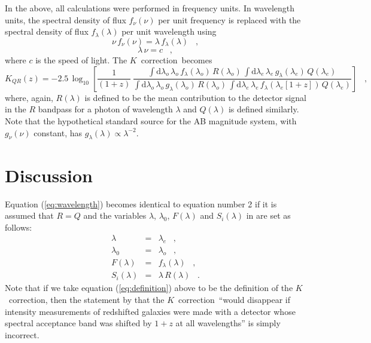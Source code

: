 \documentclass[preprint]{aastex}
\newcommand{\kcorrection}{$K$~correction}
\newcommand{\lambdaobs}{\lambda_o}
\newcommand{\lambdaemit}{\lambda_e}
\begin{document}
In the above, all calculations were performed in frequency units.  In
wavelength units, the spectral density of flux $f_{\nu}(\nu)$ per unit
frequency is replaced with the spectral density of flux
$f_{\lambda}(\lambda)$ per unit wavelength using
\begin{equation}
\nu\,f_{\nu}(\nu) = \lambda\,f_{\lambda}(\lambda) \;\;\;,
\end{equation}
\begin{equation}
\lambda\,\nu = c \;\;\;,
\end{equation}
where $c$ is the speed of light.  The \kcorrection\ becomes
\begin{equation}
\label{eq:wavelength}
K_{QR}(z) = -2.5\,\log_{10}\left[\frac{1}{(1+z)}\,
  \frac{\displaystyle
  \int\mathrm{d}\lambdaobs\,\lambdaobs\,f_{\lambda}(\lambdaobs)\,R(\lambdaobs)\,
    \int\mathrm{d}\lambdaemit\,\lambdaemit\,
    g_{\lambda}(\lambdaemit)\,     Q(\lambdaemit)}
       {\displaystyle
  \int\mathrm{d}\lambdaobs\,\lambdaobs\,g_{\lambda}(\lambdaobs)\,R(\lambdaobs)\,
    \int\mathrm{d}\lambdaemit\,\lambdaemit\,
    f_{\lambda}(\lambdaemit[1+z])\,Q(\lambdaemit)}
\right] \;\;\;,
\end{equation}
where, again, $R(\lambda)$ is defined to be the mean contribution to
the detector signal in the $R$ bandpass for a photon of wavelength
$\lambda$ and $Q(\lambda)$ is defined similarly.  Note that the
hypothetical standard source for the AB magnitude system, with
$g_{\nu}(\nu)$ constant, has
$g_{\lambda}(\lambda)\propto\lambda^{-2}$.

\section{Discussion}

Equation (\ref{eq:wavelength}) becomes identical to \citet{oke68a}
equation number 2 if it is assumed that $R=Q$ and the variables
$\lambda$, $\lambda_0$, $F(\lambda)$ and $S_i(\lambda)$ in
\citet{oke68a} are set as follows:
\begin{eqnarray}\displaystyle
\lambda & = & \lambdaemit \;\;\;, \nonumber \\
\lambda_0 & = & \lambdaobs \;\;\;, \nonumber \\
F(\lambda) & = & f_{\lambda}(\lambda) \;\;\;, \nonumber \\
S_i(\lambda) & = & \lambda\,R(\lambda) \;\;\;.
\end{eqnarray}
Note that if we take equation (\ref{eq:definition}) above to be the
definition of the \kcorrection, then the statement by \citet{oke68a}
that the \kcorrection\ ``would disappear if intensity measurements of
redshifted galaxies were made with a detector whose spectral
acceptance band was shifted by $1+z$ at all wavelengths'' is simply
incorrect.
\end{document}
